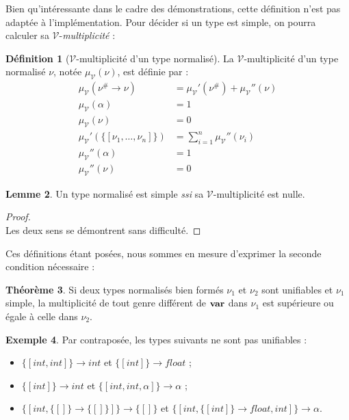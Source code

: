 \documentclass[a4paper]{report}
\newenvironment{preuve} 
	{\begin{proof}~\\} 
	{\end{proof}}
\theoremstyle{definition}
\newtheorem{theoreme}{Théorème}
\newtheorem{definition}[theoreme]{Définition}
\newtheorem{lemme}[theoreme]{Lemme}
\newtheorem{exemple}[theoreme]{Exemple}
\newcommand{\mset}[1]{\{\![#1]\!\}}
\newcommand{\ssi}{\textit{ssi}\xspace}
\newcommand{\V}{\mathscr{V}}
\begin{document}
Bien qu'intéressante dans le cadre des démonstrations, cette définition n'est pas adaptée à l'implémentation. Pour décider si un type est simple, on pourra calculer sa $\V$-\emph{multiplicité} :

\begin{definition}[$\V$-multiplicité d'un type normalisé]
	La $\V$-multiplicité d'un type normalisé $\nu$, notée $\mu_\V (\nu)$, est définie par :
	\begin{align*}
			\mu_\V (\nu^\# \rightarrow \nu) &=
			\mu_\V' (\nu^\#) + \mu_\V'' (\nu)
		\\
			\mu_\V (\alpha) &=
			1
		\\
			\mu_\V (\nu) &=
			0
		\\
			\mu_\V' (\mset{\nu_1, \dots, \nu_n}) &=
			\sum_{i=1}^n \mu_\V'' (\nu_i)
		\\
			\mu_\V'' (\alpha) &=
			1
		\\
			\mu_\V'' (\nu) &=
			0
	\end{align*}
\end{definition}

\begin{lemme}
	Un type normalisé est simple \ssi sa $\V$-multiplicité est nulle.
\end{lemme}

\begin{preuve}
	Les deux sens se démontrent sans difficulté.
\end{preuve}

Ces définitions étant posées, nous sommes en mesure d'exprimer la seconde condition nécessaire :

\begin{theoreme} \label{thm_cond2}
	Si deux types normalisés bien formés $\nu_1$ et $\nu_2$ sont unifiables et $\nu_1$ simple, la multiplicité de tout genre différent de $\bold{var}$ dans $\nu_1$ est supérieure ou égale à celle dans $\nu_2$.
\end{theoreme}

\begin{exemple}
	Par contraposée, les types suivants ne sont pas unifiables :
	\begin{itemize}
		\item $\mset{int, int} \rightarrow int$ et $\mset{int} \rightarrow float$ ;
		\item $\mset{int} \rightarrow int$ et $\mset{int, int, \alpha} \rightarrow \alpha$ ;
		\item $\mset{int, \mset{} \rightarrow \mset{}} \rightarrow \mset{}$ et $\mset{int, \mset{int} \rightarrow float, int} \rightarrow \alpha$.
	\end{itemize}
\end{exemple}
\end{document}
